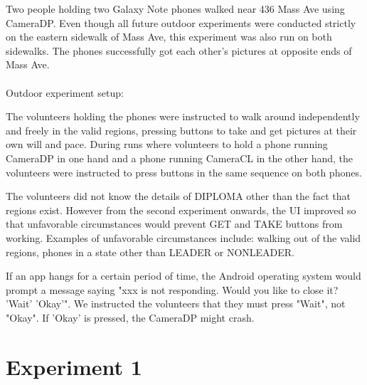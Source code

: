 Two people holding two Galaxy Note phones walked near 436 Mass Ave using CameraDP. Even though all future outdoor experiments were conducted strictly on the eastern sidewalk of Mass Ave, this experiment was also run on both sidewalks. The phones successfully got each other's pictures at opposite ends of Mass Ave.
\\
\\
Outdoor experiment setup:

The volunteers holding the phones were instructed to walk around independently and freely in the valid regions, pressing buttons to take and get pictures at their own will and pace. During runs where volunteers to hold a phone running CameraDP in one hand and a phone running CameraCL in the other hand, the volunteers were instructed to press buttons in the same sequence on both phones.

The volunteers did not know the details of DIPLOMA other than the fact that regions exist. However from the second experiment onwards, the UI improved so that unfavorable circumstances would prevent GET and TAKE buttons from working. Examples of unfavorable circumstances include: walking out of the valid regions, phones in a state other than LEADER or NONLEADER.

If an app hangs for a certain period of time, the Android operating system would prompt a message saying "xxx is not responding. Would you like to close it? 'Wait' 'Okay'". We instructed the volunteers that they must press "Wait", not "Okay". If 'Okay' is pressed, the CameraDP might crash.

\section{Experiment 1}

